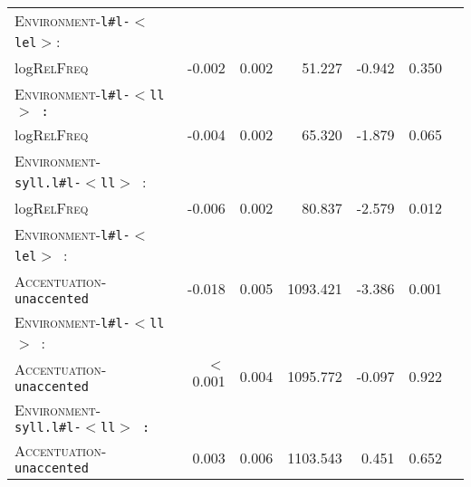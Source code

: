 \begin{table}
{\begin{tabular} {lrrrrrr}
		\textsc{Environment}-\texttt{l\#l-$<$lel$>$}: &&&&&\\
		log\textsc{RelFreq }& \color[HTML]{9B9B9B}-0.002 &\color[HTML]{9B9B9B} 0.002 & \color[HTML]{9B9B9B}51.227 &\color[HTML]{9B9B9B} -0.942 & \color[HTML]{9B9B9B}0.350 \\ 
		
		\textsc{Environment}-\texttt{l\#l-$<$ll$>$ :}  &&&&&\\
		log\textsc{RelFreq }&\color[HTML]{9B9B9B} -0.004 & \color[HTML]{9B9B9B}0.002 &\color[HTML]{9B9B9B} 65.320 & \color[HTML]{9B9B9B}-1.879 &\color[HTML]{9B9B9B} 0.065 \\ 
		
		\textsc{Environment}-\texttt{syll.l\#l-$<$ll$>$ }: &&&&&\\
		log\textsc{RelFreq }& -0.006 & 0.002 & 80.837 & -2.579 & 0.012 \\ 
		
		\textsc{Environment}-\texttt{l\#l-$<$lel$>$ }: &&&&&\\
		\textsc{Accentuation}-\texttt{unaccented} & -0.018 & 0.005 & 1093.421 & -3.386 & 0.001 \\ 
		
		\textsc{Environment}-\texttt{l\#l-$<$ll$>$ }: &&&&&\\
		\textsc{Accentuation}-\texttt{unaccented} & \color[HTML]{9B9B9B}$<$0.001&\color[HTML]{9B9B9B} 0.004 &\color[HTML]{9B9B9B} 1095.772 & \color[HTML]{9B9B9B}-0.097 & \color[HTML]{9B9B9B}0.922 \\ 
		
		\textsc{Environment}-\texttt{syll.l\#l-$<$ll$>$ :} &&&&&\\
		\textsc{Accentuation}-\texttt{unaccented} &\color[HTML]{9B9B9B} 0.003 & \color[HTML]{9B9B9B}0.006 &\color[HTML]{9B9B9B} 1103.543 & \color[HTML]{9B9B9B}0.451 &\color[HTML]{9B9B9B} 0.652 \\ 
		\midrule
			\end{tabular}
}


\end{table}




